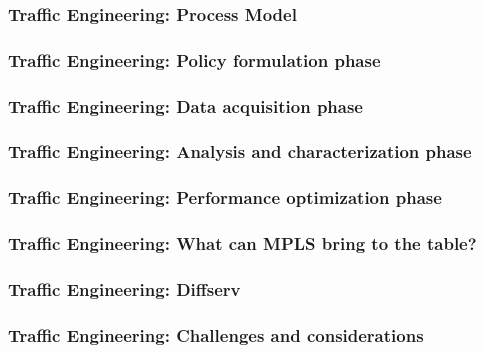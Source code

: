 \documentclass[12pt]{beamer}
\begin{document}
\begin{frame}
  \frametitle{Traffic Engineering: Process Model}
\end{frame}

\begin{frame}
  \frametitle{Traffic Engineering: Policy formulation phase}
\end{frame}

\begin{frame}
  \frametitle{Traffic Engineering: Data acquisition phase}
\end{frame}

\begin{frame}
  \frametitle{Traffic Engineering: Analysis and characterization phase}
\end{frame}

\begin{frame}
  \frametitle{Traffic Engineering: Performance optimization phase}
\end{frame}

\begin{frame}
  \frametitle{Traffic Engineering: What can MPLS bring to the table?}
\end{frame}

\begin{frame}
  \frametitle{Traffic Engineering: Diffserv}
\end{frame}

\begin{frame}
  \frametitle{Traffic Engineering: Challenges and considerations}
\end{frame}
\end{document}
